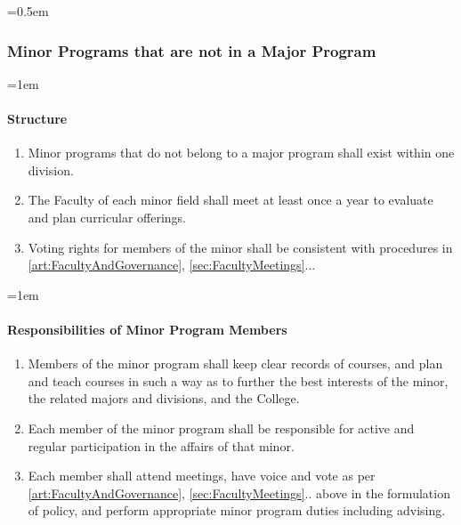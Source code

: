 \documentclass{manual}
\let\oldsubsubsection\subsubsection
\renewcommand\subsubsection{\leftskip=0.5em\oldsubsubsection}
\let\oldparagraph\paragraph
\renewcommand\paragraph{\leftskip=1em\oldparagraph}
\newcommand{\itemLevelA}{\alph*.}
\newcommand{\itemRefA}{\alph*}
\begin{document}
\subsubsection{Minor Programs that are not in a Major Program}
\paragraph{Structure}
\begin{enumerate}[label=\itemLevelA,ref=\itemRefA]
\item Minor programs that do not belong to a major program shall exist within one division.

\item The Faculty of each minor field shall meet at least once a year to evaluate and plan curricular offerings. 
\item Voting rights for members of the minor shall be consistent with procedures in \cref{art:FacultyAndGovernance}, \cref{sec:FacultyMeetings}...
\end{enumerate}

\paragraph{Responsibilities of Minor Program Members}
\begin{enumerate}[label=\itemLevelA,ref=\itemRefA]
\item Members of the minor program shall keep clear records of courses, and plan and teach courses in such a way as to further the best interests of the minor, the related majors and divisions, and the College.
\item Each member of the minor program shall be responsible for active and regular participation in the affairs of that minor.
\item Each member shall attend meetings, have voice and vote as per \cref{art:FacultyAndGovernance}, \cref{sec:FacultyMeetings}.. above in the formulation of policy, and perform appropriate minor program duties including advising.
\end{enumerate}

\end{document}
